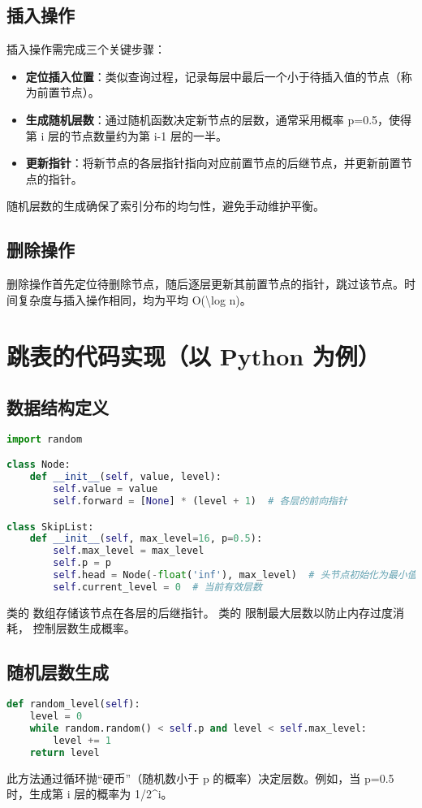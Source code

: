 \section{插入操作}
插入操作需完成三个关键步骤：\par
\begin{itemize}
\item \textbf{定位插入位置}：类似查询过程，记录每层中最后一个小于待插入值的节点（称为前置节点）。
\item \textbf{生成随机层数}：通过随机函数决定新节点的层数，通常采用概率 p=0.5，使得第 i 层的节点数量约为第 i-1 层的一半。
\item \textbf{更新指针}：将新节点的各层指针指向对应前置节点的后继节点，并更新前置节点的指针。
\end{itemize}
随机层数的生成确保了索引分布的均匀性，避免手动维护平衡。\par
\section{删除操作}
删除操作首先定位待删除节点，随后逐层更新其前置节点的指针，跳过该节点。时间复杂度与插入操作相同，均为平均 O(\textbackslash{}log n)。\par
\chapter{跳表的代码实现（以 Python 为例）}
\section{数据结构定义}
\begin{lstlisting}[language=python]
import random  

class Node:  
    def __init__(self, value, level):  
        self.value = value  
        self.forward = [None] * (level + 1)  # 各层的前向指针  

class SkipList:  
    def __init__(self, max_level=16, p=0.5):  
        self.max_level = max_level  
        self.p = p  
        self.head = Node(-float('inf'), max_level)  # 头节点初始化为最小值  
        self.current_level = 0  # 当前有效层数  
\end{lstlisting}
 类的  数组存储该节点在各层的后继指针。 类的  限制最大层数以防止内存过度消耗， 控制层数生成概率。\par
\section{随机层数生成}
\begin{lstlisting}[language=python]
def random_level(self):  
    level = 0  
    while random.random() < self.p and level < self.max_level:  
        level += 1  
    return level  
\end{lstlisting}
此方法通过循环抛“硬币”（随机数小于 p 的概率）决定层数。例如，当 p=0.5 时，生成第 i 层的概率为 1/2\^{}i。\par
